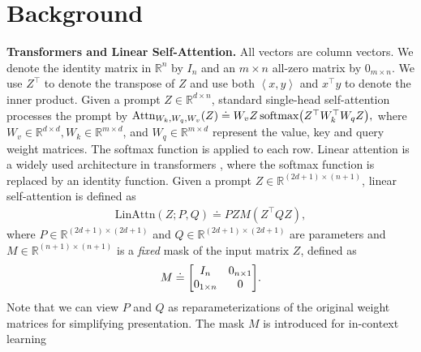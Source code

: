 \documentclass{article}
\newcommand{\R}{\mathbb{R}}
\newcommand{\indot}[2]{{\left<#1, #2\right>}}
\newcommand{\attn}{\text{LinAttn}}
\newcommand{\softmax}[1]{\text{softmax}\qty(#1)}
\begin{document}
\section{Background}
\label{sec bkg}
\textbf{Transformers and Linear Self-Attention.}
All vectors are column vectors.
We denote the identity matrix in $\R^n$ by $I_n$ and an $m \times n$ all-zero matrix by $0_{m\times n}$.
We use $Z^\top$ to denote the transpose of $Z$ and use both $\indot{x}{y}$ and $x^\top y$ to denote the inner product.
Given a prompt $Z \in \R^{d \times n}$, standard single-head self-attention \citep{vaswani2017} processes the prompt by
$
    \text{Attn}_{W_k, W_q, W_v}(Z) \doteq W_v Z\,  \softmax{Z^\top W_k^\top W_q Z},
$
where $W_v \in \R^{d \times d}, W_k \in \R^{m \times d}$, and  $W_q \in \R^{m \times d}$ represent the value, key and query weight matrices.
The softmax function is applied to each row. 
Linear attention is a widely used architecture in transformers \citep{mahankali2023one,ahn2023linear, vonoswald2023transformers, von2023uncovering, wu2023many, ahn2024transformers, gatmiry2024can, zhang2024trained,zheng2024mesa, sander2024transformers}, 
where the softmax function is replaced by an identity function.
Given a prompt $Z\in\R^{(2d+1) \times (n+1)}$,
linear self-attention is defined as
\begin{align}
    \label{eq linear attention}
    \attn(Z; P, Q) \doteq PZM(Z^\top Q Z),
\end{align}
where $P \in \R^{(2d+1) \times (2d+1)}$ and $Q \in \R^{(2d+1) \times (2d+1)}$ are parameters and $M \in \R^{(n+1) \times (n+1)}$ is a \emph{fixed} mask of the input matrix $Z$, defined as
\begin{align}
    \label{eq td0 mask}
    \textstyle M \doteq \mqty[I_{n} & 0_{n \times 1} \\ 
    0_{1 \times n} & 0].
\end{align}
Note that we can view $P$ and $Q$ as reparameterizations of the original weight matrices for simplifying presentation.
The mask $M$ is introduced for in-context learning \citep{vonoswald2023transformers}
\end{document}
